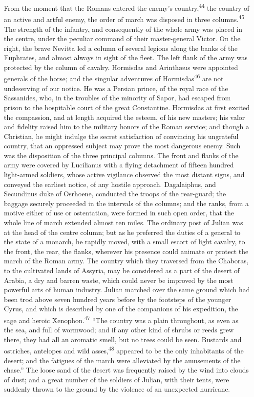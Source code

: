 From the moment that the Romans entered the enemy’s country,\textsuperscript{44}
the country of an active and artful enemy, the order of march was
disposed in three columns.\textsuperscript{45} The strength of the infantry, and
consequently of the whole army was placed in the centre, under
the peculiar command of their master-general Victor. On the
right, the brave Nevitta led a column of several legions along
the banks of the Euphrates, and almost always in sight of the
fleet. The left flank of the army was protected by the column of
cavalry. Hormisdas and Arinthæus were appointed generals of the
horse; and the singular adventures of Hormisdas\textsuperscript{46} are not
undeserving of our notice. He was a Persian prince, of the royal
race of the Sassanides, who, in the troubles of the minority of
Sapor, had escaped from prison to the hospitable court of the
great Constantine. Hormisdas at first excited the compassion, and
at length acquired the esteem, of his new masters; his valor and
fidelity raised him to the military honors of the Roman service;
and though a Christian, he might indulge the secret satisfaction
of convincing his ungrateful country, that an oppressed subject
may prove the most dangerous enemy. Such was the disposition of
the three principal columns. The front and flanks of the army
were covered by Lucilianus with a flying detachment of fifteen
hundred light-armed soldiers, whose active vigilance observed the
most distant signs, and conveyed the earliest notice, of any
hostile approach. Dagalaiphus, and Secundinus duke of Osrhoene,
conducted the troops of the rear-guard; the baggage securely
proceeded in the intervals of the columns; and the ranks, from a
motive either of use or ostentation, were formed in such open
order, that the whole line of march extended almost ten miles.
The ordinary post of Julian was at the head of the centre column;
but as he preferred the duties of a general to the state of a
monarch, he rapidly moved, with a small escort of light cavalry,
to the front, the rear, the flanks, wherever his presence could
animate or protect the march of the Roman army. The country which
they traversed from the Chaboras, to the cultivated lands of
Assyria, may be considered as a part of the desert of Arabia, a
dry and barren waste, which could never be improved by the most
powerful arts of human industry. Julian marched over the same
ground which had been trod above seven hundred years before by
the footsteps of the younger Cyrus, and which is described by one
of the companions of his expedition, the sage and heroic
Xenophon.\textsuperscript{47} “The country was a plain throughout, as even as the
sea, and full of wormwood; and if any other kind of shrubs or
reeds grew there, they had all an aromatic smell, but no trees
could be seen. Bustards and ostriches, antelopes and wild asses,\textsuperscript{48}
appeared to be the only inhabitants of the desert; and the
fatigues of the march were alleviated by the amusements of the
chase.” The loose sand of the desert was frequently raised by the
wind into clouds of dust; and a great number of the soldiers of
Julian, with their tents, were suddenly thrown to the ground by
the violence of an unexpected hurricane.

